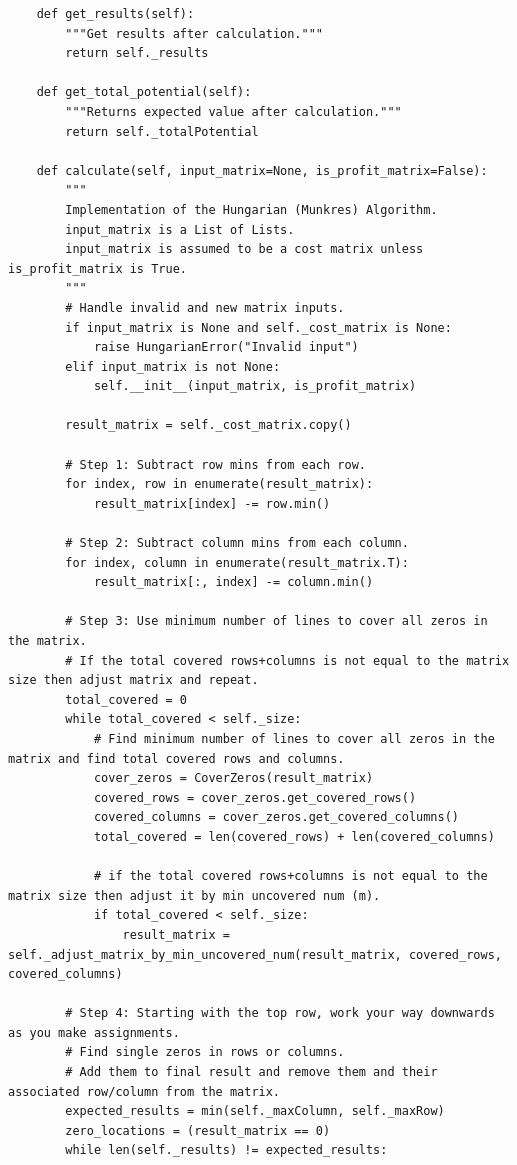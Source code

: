 \documentclass[12pt, letterpaper, twoside]{book}
\begin{document}
\begin{lstlisting}
    def get_results(self):
        """Get results after calculation."""
        return self._results

    def get_total_potential(self):
        """Returns expected value after calculation."""
        return self._totalPotential

    def calculate(self, input_matrix=None, is_profit_matrix=False):
        """
        Implementation of the Hungarian (Munkres) Algorithm.
        input_matrix is a List of Lists.
        input_matrix is assumed to be a cost matrix unless is_profit_matrix is True.
        """
        # Handle invalid and new matrix inputs.
        if input_matrix is None and self._cost_matrix is None:
            raise HungarianError("Invalid input")
        elif input_matrix is not None:
            self.__init__(input_matrix, is_profit_matrix)

        result_matrix = self._cost_matrix.copy()

        # Step 1: Subtract row mins from each row.
        for index, row in enumerate(result_matrix):
            result_matrix[index] -= row.min()

        # Step 2: Subtract column mins from each column.
        for index, column in enumerate(result_matrix.T):
            result_matrix[:, index] -= column.min()

        # Step 3: Use minimum number of lines to cover all zeros in the matrix.
        # If the total covered rows+columns is not equal to the matrix size then adjust matrix and repeat.
        total_covered = 0
        while total_covered < self._size:
            # Find minimum number of lines to cover all zeros in the matrix and find total covered rows and columns.
            cover_zeros = CoverZeros(result_matrix)
            covered_rows = cover_zeros.get_covered_rows()
            covered_columns = cover_zeros.get_covered_columns()
            total_covered = len(covered_rows) + len(covered_columns)

            # if the total covered rows+columns is not equal to the matrix size then adjust it by min uncovered num (m).
            if total_covered < self._size:
                result_matrix = self._adjust_matrix_by_min_uncovered_num(result_matrix, covered_rows, covered_columns)

        # Step 4: Starting with the top row, work your way downwards as you make assignments.
        # Find single zeros in rows or columns.
        # Add them to final result and remove them and their associated row/column from the matrix.
        expected_results = min(self._maxColumn, self._maxRow)
        zero_locations = (result_matrix == 0)
        while len(self._results) != expected_results:


\end{lstlisting}
\end{document}
